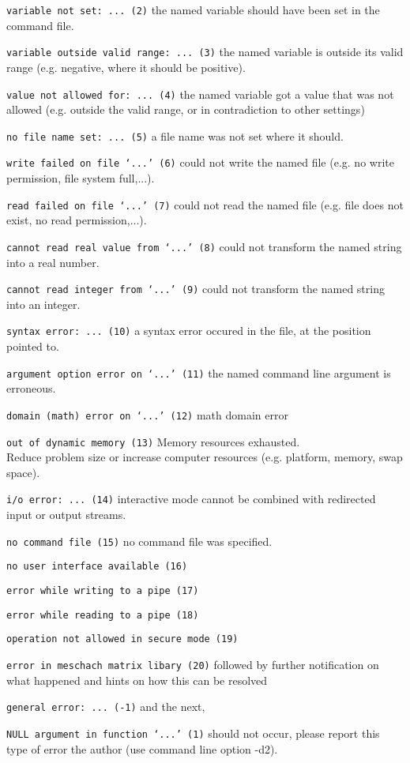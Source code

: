 \documentclass[a4paper,12pt]{book}
\newcommand{\code}[1]{\texttt{#1}}
\newenvironment{codelist}{%
\begin{description}\setlength{\labelsep}{0.5cm}}{%
\end{description}}
\begin{document}
\begin{codelist}
\item[\code{variable not set: ... (2)}]
the named variable should have been set in the command file.
\item[\code{variable outside valid range: ... (3)}]
the named variable is outside its valid range (e.g. negative, where it
should be positive).
\item[\code{value not allowed for: ... (4)}]
the named variable got a value that was not allowed (e.g. outside the
valid range, or in contradiction to other settings)
\item[\code{no file name set: ... (5)}]
a file name was not set where it should.
\item[\code{write failed on file `...' (6)}]
could not write the named file (e.g. no write permission, file system
full,...).
\item[\code{read failed on file `...' (7)}]
could not read the named file (e.g. file does not exist, no read
permission,...).
\item[\code{cannot read real value from `...' (8)}]
could not transform the named string into a real number.
\item[\code{cannot read integer from `...' (9)}]
could not transform the named string into an integer.
\item[\code{syntax error: ... (10)}]
a syntax error occured in the file, at the position pointed to.
\item[\code{argument option error on `...' (11)}]
the named command line argument is erroneous.
\item[\code{domain (math) error on `...' (12)}]
math domain error
\item[\code{out of dynamic memory (13)}] Memory resources exhausted.\\
Reduce problem size or increase computer resources 
(e.g. platform, memory, swap space).
\item[\code{i/o error: ... (14)}]
interactive mode cannot be combined with redirected input or output
streams.
\item[\code{no command file (15)}]
no command file was specified.
\item[\code{no user interface available (16)}]
\item[\code{error while writing to a pipe (17)}]
\item[\code{error while reading to a pipe (18)}]
\item[\code{operation not allowed in secure mode (19)}]
\item[\code{error in meschach matrix libary (20)}] followed by further
notification on what happened and hints on how this can be resolved
\item[\code{general error: ... (-1)}] and the next,
\item[\code{NULL argument in function `...' (1)}] should not occur,
please report this type of error the author (use command line option -d2).
\end{codelist}
\end{document}
